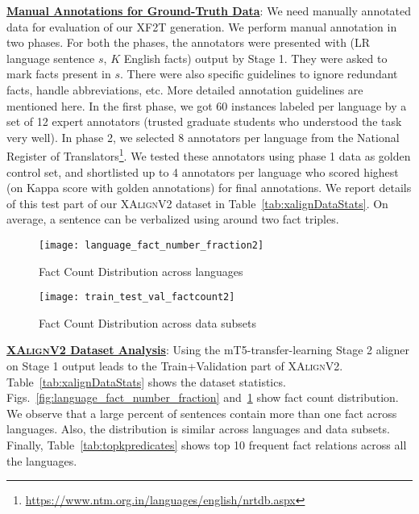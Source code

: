 \documentclass[runningheads]{llncs}
\newcommand{\data}{\textsc{XAlignV2}}
\begin{document}
\noindent\underline{\textbf{Manual Annotations for Ground-Truth Data}}:
We need manually annotated data for evaluation of our XF2T generation. We perform manual annotation in two phases. For both the phases, the annotators were presented with (LR language sentence $s$, $K$ English facts) output by Stage 1. They were asked to mark facts present in $s$. There were also specific guidelines to ignore redundant facts, handle abbreviations, etc. More detailed annotation guidelines are mentioned here.
In the first phase, we got 60 instances labeled per language by a set of 12 expert annotators (trusted graduate students who understood the task very well). In phase 2, we selected 8 annotators per language from the National Register of Translators\footnote{\url{https://www.ntm.org.in/languages/english/nrtdb.aspx}}. We tested these annotators using phase 1 data as golden control set, and  shortlisted up to 4 annotators per language who scored highest (on Kappa score with golden annotations) for final annotations. We report details of this test part of our \textsc{XAlignV2} dataset in Table~\ref{tab:xalignDataStats}. On average, a sentence can be verbalized using around two fact triples.

\begin{figure}[!t]
\begin{minipage}{0.48\columnwidth}
    \centering
    \texttt{[image: language\_fact\_number\_fraction2]}
    \caption{Fact Count Distribution across languages}
    \label{fig:language_fact_number_fraction}
    \end{minipage}
    \hspace{0.05\columnwidth}
    \begin{minipage}{0.46\columnwidth}
    \centering
    \texttt{[image: train\_test\_val\_factcount2]}
    \caption{Fact Count Distribution across data subsets}
    \label{fig:train_test_val_factcount}
    \end{minipage}
\end{figure}

\noindent\underline{\textbf{\data{} Dataset Analysis}}: 
Using the mT5-transfer-learning Stage 2 aligner on Stage 1 output leads to the Train+Validation part of \data{}. Table~\ref{tab:xalignDataStats} shows the dataset statistics. Figs.~\ref{fig:language_fact_number_fraction} and~\ref{fig:train_test_val_factcount}  show fact count distribution. We observe that a large percent of sentences contain more than one fact across languages. Also, the distribution is similar across languages and data subsets.
Finally, Table~\ref{tab:topkpredicates} shows top 10 frequent fact relations across all the languages. 
\end{document}
